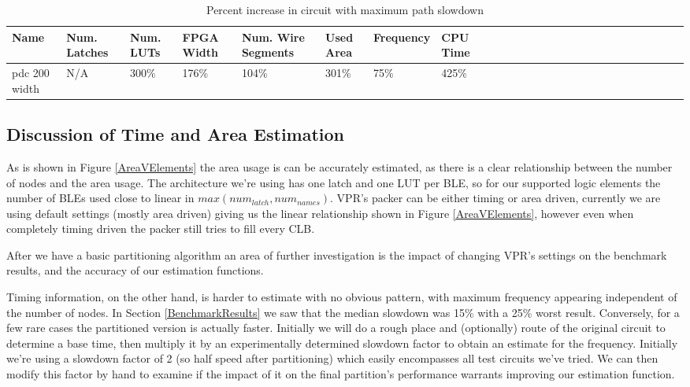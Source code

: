\documentclass[12pt,final,oneside]{memoir} %
\begin{document}
\begin{table}
    \begin{adjustwidth}{-1cm}{-1.1cm}
        \begin{tabularx}{1.1\textwidth}{XXXXXXXXXXXXXXXXXXXXXXXXXX}
           \toprule
            Name & Num. Latches & Num. \acp{LUT} & FPGA Width & Num. Wire Segments & Used Area & Frequency & CPU Time\\
            \midrule
pdc 200 width   & N/A   & 300\% & 176\% & 104\% & 301\% &  75\% & 425\%\\
          \bottomrule
        \end{tabularx}
        \caption{Percent increase in circuit with maximum path slowdown}
        \label{timing}
    \end{adjustwidth}
\end{table}
\subsection{Discussion of Time and Area Estimation}
As is shown in Figure \ref{AreaVElements} the area usage is can be accurately estimated, as there is a clear relationship between the number of nodes and the area usage. The architecture we're using has one latch and one \ac{LUT} per \ac{BLE}, so for our supported logic elements the number of \acp{BLE} used close to linear in $max(num_{latch}, num_{names})$. \ac{VPR}'s packer can be either timing or area driven, currently we are using default settings (mostly area driven) giving us the linear relationship shown in Figure \ref{AreaVElements}, however even when completely timing driven the packer still tries to fill every \ac{CLB}\cite{AAPackThesis}.

After we have a basic partitioning algorithm an area of further investigation is the impact of changing \ac{VPR}'s settings on the benchmark results, and the accuracy of our estimation functions.

Timing information, on the other hand, is harder to estimate with no obvious pattern, with maximum frequency appearing independent of the number of nodes. In Section \ref{BenchmarkResults} we saw that the median slowdown was 15\% with a 25\% worst result. Conversely, for a few rare cases the partitioned version is actually faster. Initially we will do a rough place and (optionally) route of the original circuit to determine a base time, then multiply it by an experimentally determined slowdown factor to obtain an estimate for the frequency. Initially we're using a slowdown factor of 2 (so half speed after partitioning) which easily encompasses all test circuits we've tried. We can then modify this factor by hand to examine if the impact of it on the final partition's performance warrants improving our estimation function.
\end{document}
